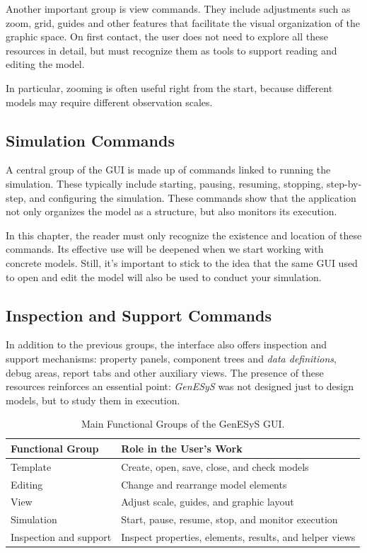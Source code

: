 Another important group is view commands. They include adjustments such as zoom, grid, guides and other features that facilitate the visual organization of the graphic space. On first contact, the user does not need to explore all these resources in detail, but must recognize them as tools to support reading and editing the model.

In particular, zooming is often useful right from the start, because different models may require different observation scales.

\subsection{Simulation Commands}
\label{subsec:cap3_comandos_simulacao}

A central group of the GUI is made up of commands linked to running the simulation. These typically include starting, pausing, resuming, stopping, step-by-step, and configuring the simulation. These commands show that the application not only organizes the model as a structure, but also monitors its execution.

In this chapter, the reader must only recognize the existence and location of these commands. Its effective use will be deepened when we start working with concrete models. Still, it's important to stick to the idea that the same GUI used to open and edit the model will also be used to conduct your simulation.

\subsection{Inspection and Support Commands}
\label{subsec:cap3_comandos_inspecao_apoio}

In addition to the previous groups, the interface also offers inspection and support mechanisms: property panels, component trees and \textit{data definitions}, debug areas, report tabs and other auxiliary views. The presence of these resources reinforces an essential point: \textit{GenESyS} was not designed just to design models, but to study them in execution.

\begin{table}[htbp]
\centering
\caption{Main Functional Groups of the GenESyS GUI.}
 \label{tab:cap3_grupos_funcionais}
\small
\begin{tabular}{|p{3.6cm}|p{7.0cm}|}
\hline
\textbf{Functional Group} & \textbf{Role in the User's Work} \\
\hline
Template & Create, open, save, close, and check models\\
\hline
Editing & Change and rearrange model elements \\
\hline
View & Adjust scale, guides, and graphic layout \\
\hline
Simulation & Start, pause, resume, stop, and monitor execution \\
\hline
Inspection and support & Inspect properties, elements, results, and helper views \\
\hline
 \end{tabular}
\end{table}

